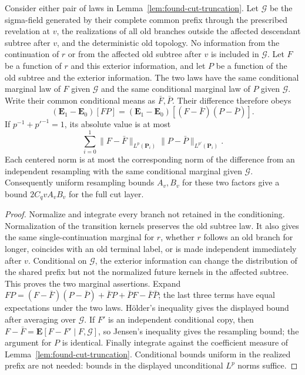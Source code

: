 \begin{lemma}\label{lem:found-coupling}
Consider either pair of laws in Lemma~\ref{lem:found-cut-truncation}.
Let $\mathcal G$ be the sigma-field generated by their complete common
prefix through the prescribed revelation at $v$, the realizations of
all old branches outside the affected descendant subtree after $v$,
and the deterministic old topology. No information from the continuation
of $r$ or from the affected old subtree after $v$ is included in
$\mathcal G$. Let $F$ be a function of $r$ and
this exterior information, and let $P$ be a function of the old
subtree and the exterior information. The two laws have the same
conditional marginal law of $F$ given $\mathcal G$ and the same
conditional marginal law of $P$ given $\mathcal G$. Write their common
conditional means as $\bar F,\bar P$. Their difference therefore obeys
\[
 (\mathbf E_1-\mathbf E_0)[FP]
   =(\mathbf E_1-\mathbf E_0)[(F-\bar F)(P-\bar P)].
\]
If $p^{-1}+p'^{-1}=1$, its absolute value is at most
\[
 \sum_{i=0}^1\|F-\bar F\|_{L^p(\mathbf P_i)}
                  \|P-\bar P\|_{L^{p'}(\mathbf P_i)}.
\]
Each centered norm is at most the corresponding norm of the difference
from an independent resampling with the same conditional marginal given
$\mathcal G$. Consequently uniform resampling bounds $A_v,B_v$ for
these two factors give a bound $2C_qvA_vB_v$ for the full cut layer.
\end{lemma}

\begin{proof}
Normalize and integrate every branch not retained in the conditioning.
Normalization of the transition kernels preserves the old subtree law.
It also gives the same single-continuation marginal for $r$, whether
$r$ follows an old branch for longer, coincides with an old terminal
label, or is made independent immediately after $v$. Conditional on
$\mathcal G$, the exterior information can change the distribution of
the shared prefix but not the normalized future kernels in the affected
subtree. This proves the two marginal assertions. Expand
$FP=(F-\bar F)(P-\bar P)+\bar FP+\bar PF-\bar F\bar P$;
the last three terms have equal expectations under the two laws.
H\"older's inequality gives the displayed bound after averaging over
$\mathcal G$. If $F'$ is an independent conditional copy, then
$F-\bar F=\mathbf E[F-F'\mid F,\mathcal G]$, so Jensen's inequality
gives the resampling bound; the argument for $P$ is identical.
Finally integrate against the coefficient measure of
Lemma~\ref{lem:found-cut-truncation}. Conditional bounds uniform in
the realized prefix are not needed: bounds in the displayed
unconditional $L^p$ norms suffice.
\end{proof}

